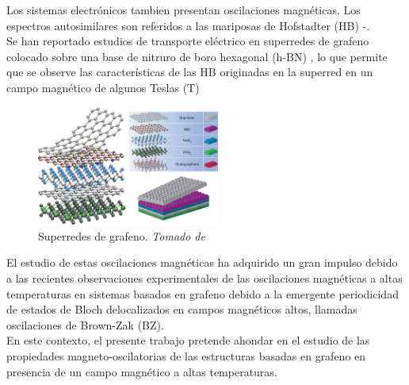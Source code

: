 \begin{frame}
	\begin{multicols}{2}
		Los sistemas electrónicos tambien presentan oscilaciones magnéticas. Los espectros autosimilares son referidos a las mariposas de Hofstadter (HB) \cite{Yu2014}-\cite{Yang2016}.\\
		Se han reportado estudios de transporte eléctrico en superredes de grafeno colocado sobre una base de nitruro de boro hexagonal (h-BN) \cite{Yankowitz2012}, lo que permite que se observe las características de las HB originadas en la superred en un campo magnético de algunos Teslas (T) \cite{BenShalom2016}
		\begin{figure}
			\includegraphics[width=6cm]{graficas/heterostructures.jpg}
			\caption{Superredes de grafeno. \textit{Tomado de} \cite{Geim2013}}
			\label{heterostructures}
		\end{figure}
	\end{multicols}
\end{frame}

\begin{frame}
	El estudio de estas oscilaciones magnéticas ha adquirido un gran impulso debido a las recientes observaciones experimentales de las oscilaciones magnéticas a altas temperaturas en sistemas basados en grafeno debido a la emergente periodicidad de estados de Bloch delocalizados en campos magnéticos altos, llamadas oscilaciones de Brown-Zak (BZ). \\
	

	En este contexto, el presente trabajo pretende ahondar en el estudio de las propiedades magneto-oscilatorias de las estructuras basadas en grafeno en presencia de un campo magnético a altas temperaturas.

\end{frame}
